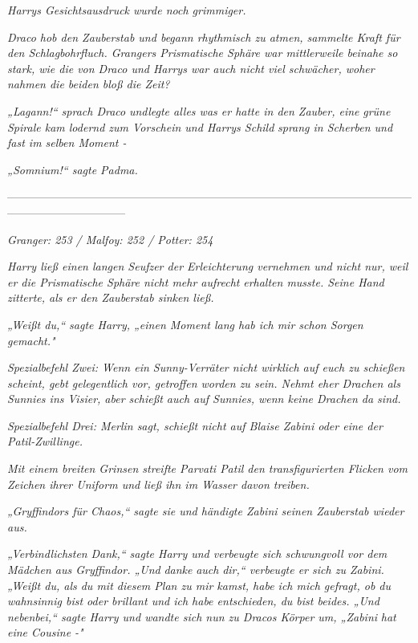 {\emph{Harrys Gesichtsausdruck wurde noch grimmiger.}

\emph{Draco hob den Zauberstab und begann rhythmisch zu atmen, sammelte Kraft für den Schlagbohrfluch. Grangers Prismatische Sphäre war mittlerweile beinahe so stark, wie die von Draco und Harrys war auch nicht viel schwächer, woher} \emph{nahmen die beiden bloß die Zeit?}

\emph{„\emph{Lagann!}“ sprach Draco} \emph{undlegte alles was er hatte in den Zauber, eine} \emph{grüne Spirale kam lodernd zum Vorschein und Harrys Schild} \emph{sprang in Scherben und fast im selben Moment -}

\emph{„\emph{Somnium!}“ sagte Padma.}

--------------------------------------------------------------------------------------------------------------------------------------------

\hfill\break \emph{Granger: 253 / Malfoy: 252 / Potter: 254}

\emph{Harry ließ einen langen Seufzer der Erleichterung vernehmen und nicht nur, weil er die Prismatische Sphäre nicht mehr aufrecht} \emph{erhalten musste. Seine Hand zitterte, als er den Zauberstab sinken ließ.}

\emph{„Weißt du,“ sagte Harry, „einen Moment lang hab ich mir schon Sorgen gemacht."}

\emph{Spezialbefehl Zwei: Wenn ein Sunny-Verräter nicht wirklich auf euch zu schießen scheint, gebt gelegentlich vor, getroffen worden zu sein. Nehmt eher Drachen als Sunnies ins Visier, aber schießt auch auf Sunnies, wenn keine Drachen da sind.}

\emph{\emph{Spezialbefehl Drei: Merlin sagt, schießt nicht auf Blaise Zabini oder eine der Patil-Zwillinge.}}

\emph{Mit einem breiten Grinsen streifte Parvati Patil den transfigurierten Flicken vom Zeichen ihrer Uniform und ließ ihn im Wasser davon treiben.}

\emph{„Gryffindors für Chaos,“ sagte sie und händigte Zabini seinen Zauberstab wieder aus.}

\emph{„\emph{Verbindlichsten}} \emph{Dank,“ sagte Harry und verbeugte sich schwungvoll vor dem Mädchen aus Gryffindor. „Und} \emph{danke} \emph{auch} \emph{\emph{dir,}“ verbeugte er sich zu Zabini. „Weißt du, als du mit diesem Plan zu mir kamst, habe ich mich gefragt, ob du wahnsinnig bist oder brillant und ich habe entschieden, du bist beides. „Und nebenbei,“ sagte Harry und wandte sich nun zu Dracos Körper um, „Zabini} \emph{\emph{hat}} \emph{eine Cousine -"}

}
